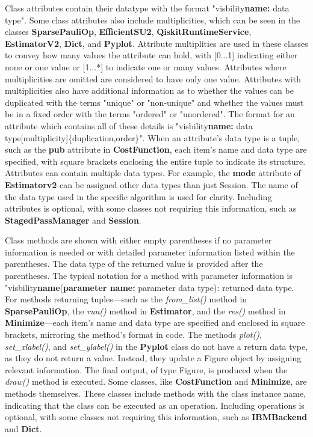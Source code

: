 \documentclass{article}
\begin{document}
Class attributes contain their datatype with the format "visbility\textbf{name:} data type". Some class attributes also include multiplicities, which can be seen in the classes \textbf{SparsePauliOp}, \textbf{EfficientSU2}, \textbf{QiskitRuntimeService}, \textbf{EstimatorV2}, \textbf{Dict}, and \textbf{Pyplot}. Attribute multiplities are used in these classes to convey how many values the attribute can hold\cite{Seidl_Scholz_Huemer_Kappel_Duffy_2014}, with [0...1] indicating either none or one value or [1...*] to indicate one or many values. Attributes where multiplicities are omitted are considered to have only one value. Attributes with multiplicities also have additional information as to whether the values can be duplicated with the terms "unique" or "non-unique" and whether the values must be in a fixed order with the terms "ordered" or "unordered"\cite{Seidl_Scholz_Huemer_Kappel_Duffy_2014}. The format for an attribute which contains all of these details is "visbility\textbf{name:} data type[multiplicity]\{duplication,order\}". When an attribute's data type is a tuple, such as the \textbf{pub} attribute in \textbf{CostFunction}, each item's name and data type are specified, with square brackets enclosing the entire tuple to indicate its structure. Attributes can contain multiple data types. For example, the \textbf{mode} attribute of \textbf{Estimatorv2} can be assigned other data types than just Session. The name of the data type used in the specific algorithm is used for clarity. Including attributes is optional, with some classes not requiring this information, such as \textbf{StagedPassManager} and \textbf{Session}. 

Class methods are shown with either empty parentheses if no parameter information is needed or with detailed parameter information listed within the parentheses. The data type of the returned value is provided after the parentheses. The typical notation for a method with parameter information is "visbility\textbf{name}(\textbf{parameter name:} parameter data type): returned data type. For methods returning tuples—such as the \textit{from\_list()} method in \textbf{SparsePauliOp}, the \textit{run()} method in \textbf{Estimator}, and the \textit{res()} method in \textbf{Minimize}—each item's name and data type are specified and enclosed in square brackets, mirroring the method's format in code. 
The methods \textit{plot()}, \textit{set\_xlabel()}, and \textit{set\_ylabel()} in the \textbf{Pyplot} class do not have a return data type, as they do not return a value. Instead, they update a Figure object by assigning relevant information. The final output, of type Figure, is produced when the \textit{draw()} method is executed. Some classes, like \textbf{CostFunction} and \textbf{Minimize}, are methods themselves. These classes include methods with the class instance name, indicating that the class can be executed as an operation. Including operations is optional, with some classes not requiring this information, such as \textbf{IBMBackend} and \textbf{Dict}. 
\end{document}
